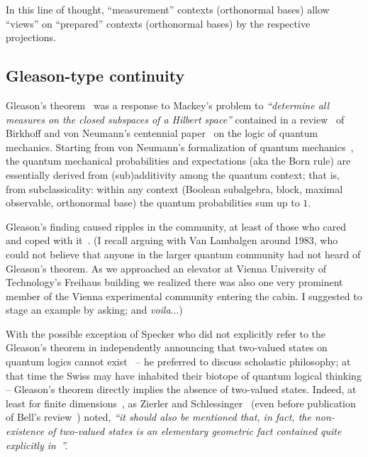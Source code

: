 In this line of thought, ``measurement'' contexts (orthonormal bases)
allow ``views'' on  ``prepared'' contexts (orthonormal bases)
by the respective projections.


\subsection{Gleason-type continuity}
\label{2017-b-c-lwtvs-gleason}

Gleason's theorem~\cite{Gleason} was a response to Mackey's
problem to {\em ``determine all measures on the closed subspaces of a Hilbert space''} contained in a review~\cite{ma-57} of
Birkhoff and von Neumann's centennial paper~\cite{birkhoff-36} on the logic of quantum mechanics.
Starting from von Neumann's formalization of quantum mechanics~\cite{v-neumann-49,v-neumann-55},
the quantum mechanical probabilities and expectations
(aka the Born rule)
are essentially derived from (sub)additivity
among the quantum context; that is, from subclassicality:
within any context (Boolean subalgebra, block, maximal observable, orthonormal base)
the quantum probabilities sum up to $1$.

Gleason's finding caused ripples in the community,
at least of those who cared and coped with
it~\cite{ZirlSchl-65,kamber65,bell-66,kochen1,c-k-m,r:dvur-93,pitowsky:218,rich-bridge}.
(I recall arguing with Van Lambalgen around 1983, who could not believe that anyone in the larger quantum community
had not heard of Gleason's theorem.
As we approached an elevator at Vienna University of Technology's Freihaus building we realized there was also one very prominent
member of the Vienna experimental community entering the cabin.
I suggested to stage an example by asking; and {\em voila}$\ldots$)

With the possible exception of Specker who did not explicitly refer to the Gleason's theorem
in independently announcing that two-valued states on quantum logics cannot exist~\cite{specker-60}
-- he preferred to discuss scholastic philosophy;
at that time the Swiss may have inhabited their biotope of quantum logical thinking --
Gleason's theorem directly implies the absence of two-valued states.
Indeed, at least for finite dimensions~\cite{Alda,Alda2},
as Zierler and Schlessinger~\cite[p.~259, Example~3.2]{ZirlSchl-65} (even before publication of Bell's review~\cite{bell-66}) noted,
{\em ``it should also be mentioned that, in fact, the non-existence of two-valued states is an elementary
geometric fact contained quite explicitly in~\cite[Paragraph~2.8]{Gleason}''.}

